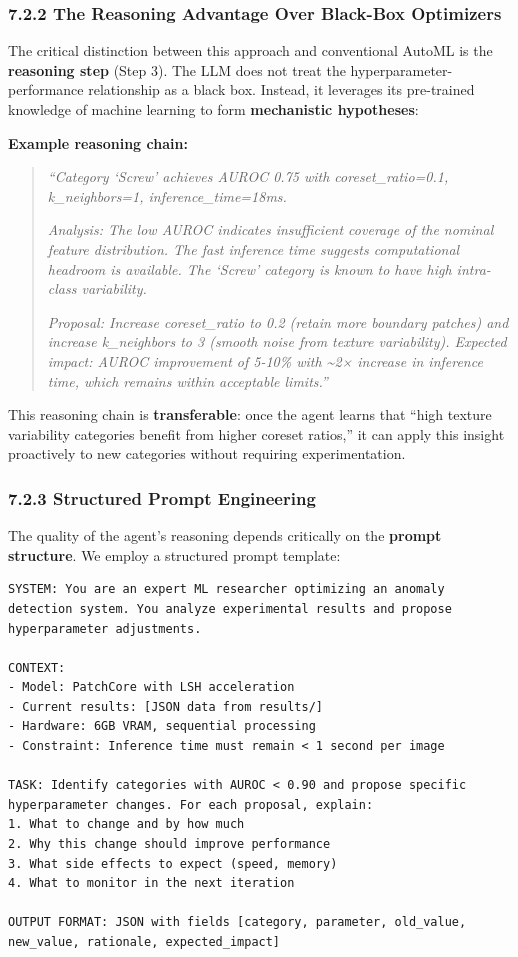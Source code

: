 \subsubsection{7.2.2 The Reasoning Advantage Over Black-Box Optimizers}\label{the-reasoning-advantage-over-black-box-optimizers}

The critical distinction between this approach and conventional AutoML is the \textbf{reasoning step} (Step 3). The LLM does not treat the hyperparameter-performance relationship as a black box. Instead, it leverages its pre-trained knowledge of machine learning to form \textbf{mechanistic hypotheses}:

\textbf{Example reasoning chain:}

\begin{quote}
\emph{``Category `Screw' achieves AUROC 0.75 with coreset\_ratio=0.1, k\_neighbors=1, inference\_time=18ms.}

\emph{Analysis: The low AUROC indicates insufficient coverage of the nominal feature distribution. The fast inference time suggests computational headroom is available. The `Screw' category is known to have high intra-class variability.}

\emph{Proposal: Increase coreset\_ratio to 0.2 (retain more boundary patches) and increase k\_neighbors to 3 (smooth noise from texture variability). Expected impact: AUROC improvement of 5-10\% with \textasciitilde2× increase in inference time, which remains within acceptable limits.''}
\end{quote}

This reasoning chain is \textbf{transferable}: once the agent learns that ``high texture variability categories benefit from higher coreset ratios,'' it can apply this insight proactively to new categories without requiring experimentation.

\subsubsection{7.2.3 Structured Prompt Engineering}\label{structured-prompt-engineering}

The quality of the agent's reasoning depends critically on the \textbf{prompt structure}. We employ a structured prompt template:

\begin{verbatim}
SYSTEM: You are an expert ML researcher optimizing an anomaly 
detection system. You analyze experimental results and propose 
hyperparameter adjustments.

CONTEXT:
- Model: PatchCore with LSH acceleration
- Current results: [JSON data from results/]
- Hardware: 6GB VRAM, sequential processing
- Constraint: Inference time must remain < 1 second per image

TASK: Identify categories with AUROC < 0.90 and propose specific
hyperparameter changes. For each proposal, explain:
1. What to change and by how much
2. Why this change should improve performance  
3. What side effects to expect (speed, memory)
4. What to monitor in the next iteration

OUTPUT FORMAT: JSON with fields [category, parameter, old_value,
new_value, rationale, expected_impact]
\end{verbatim}

